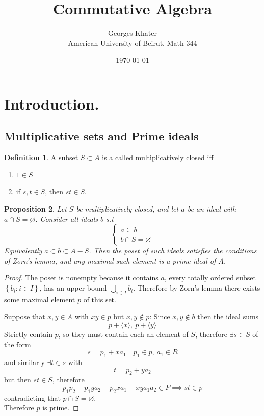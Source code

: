 \documentclass[11pt,a4paper]{article}
\title{\LARGE\bfseries Commutative Algebra}
\author{Georges Khater \\ \small American University of Beirut, Math 344}
\date{\today}
\theoremstyle{definition}
\newtheorem{definition}{Definition}[section]
\theoremstyle{plain}
\newtheorem{proposition}[definition]{Proposition}
\theoremstyle{remark}
\renewcommand{\set}[1]{\left\{ #1 \right\}}
\newcommand{\angles}[1]{\langle #1 \rangle}
\begin{document}
\maketitle
\tableofcontents
\bigskip


\section{Introduction.}
\subsection{Multiplicative sets and Prime ideals}
\begin{definition}
    A subset $S \subset A$ is a called multiplicatively closed iff 
    \begin{enumerate}
        \item $1 \in S$ 
        \item if $s,t \in S$, then $st \in S$. 
    \end{enumerate}
\end{definition}

\begin{proposition}
    Let $S$ be multiplicatively closed, and let $a$ be an ideal with $a \cap S = \varnothing$. Consider all ideals $b$ s.t 
    $$\begin{cases}
        a \subseteq b \\ 
        b \cap S = \varnothing
    \end{cases}$$
    Equivalently $a \subset b \subset A - S$. Then the poset of such ideals satisfies the conditions of Zorn's lemma, and any maximal such element is a prime ideal of $A$.  
\end{proposition}


\begin{proof}
    The poset is nonempty because it contains $a$, every totally ordered subset $\set{b_i \colon i \in I}$, has an upper bound 
    $\bigcup_{i \in I} b_i$. Therefore by Zorn's lemma there exists some maximal element $p$ of this set. 

    Suppose that $x, y \in A$ with $xy \in p$ but $x, y \not\in p$: Since $x,y \not\in b$ then the ideal sums 
    $$p + \angles{x}, \ p + \angles{y}$$
    Strictly contain $p$, so they must contain each an element of $S$, therefore $\exists s \in S$ of the form 
    $$s = p_1 + xa_1 \quad p_1 \in p, \ a_1 \in R$$
    and similarly $\exists t \in s$ with 
    $$t = p_2 + y a_2$$
    but then $st \in S$, therefore 
    $$p_1 p_2 + p_1 y a_2 + p_2 x a_1 + xy a_1 a_2 \in P \implies st \in p$$ 
    contradicting that $p \cap S = \varnothing$. \\
    Therefore $p$ is prime.
\end{proof}
\end{document}
